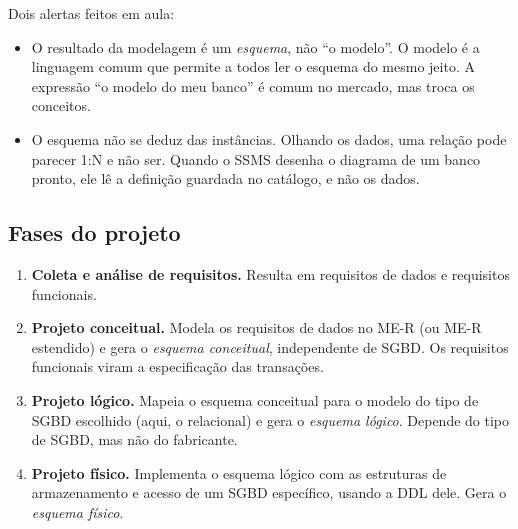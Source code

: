 Dois alertas feitos em aula:

\begin{itemize}
	\item O resultado da modelagem é um \emph{esquema}, não ``o modelo''. O
	modelo é a linguagem comum que permite a todos ler o esquema do mesmo
	jeito. A expressão ``o modelo do meu banco'' é comum no mercado, mas
	troca os conceitos.
	\item O esquema não se deduz das instâncias. Olhando os dados, uma
	relação pode parecer 1:N e não ser. Quando o SSMS desenha o diagrama
	de um banco pronto, ele lê a definição guardada no catálogo, e não os
	dados.
\end{itemize}

\subsection{Fases do projeto}

\begin{enumerate}
	\item \textbf{Coleta e análise de requisitos.} Resulta em requisitos de
	dados e requisitos funcionais.
	\item \textbf{Projeto conceitual.} Modela os requisitos de dados no
	ME-R (ou ME-R estendido) e gera o \emph{esquema conceitual},
	independente de SGBD. Os requisitos funcionais viram a especificação
	das transações.
	\item \textbf{Projeto lógico.} Mapeia o esquema conceitual para o
	modelo do tipo de SGBD escolhido (aqui, o relacional) e gera o
	\emph{esquema lógico}. Depende do tipo de SGBD, mas não do fabricante.
	\item \textbf{Projeto físico.} Implementa o esquema lógico com as
	estruturas de armazenamento e acesso de um SGBD específico, usando a
	DDL dele. Gera o \emph{esquema físico}.
\end{enumerate}


